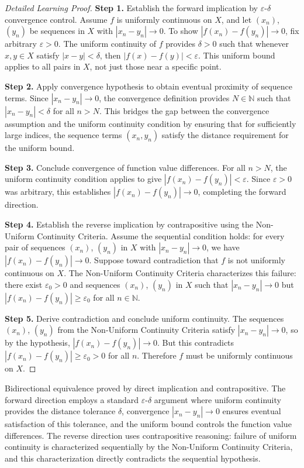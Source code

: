 \begin{proof}[Detailed Learning Proof]
\LRAProofBodyStart

\textbf{Step 1.} Establish the forward implication by $\varepsilon$-$\delta$ convergence control.
Assume $f$ is uniformly continuous on $X$, and let $(x_n)$, $(y_n)$ be sequences in $X$ with $|x_n - y_n| \to 0$. To show $|f(x_n) - f(y_n)| \to 0$, fix arbitrary $\varepsilon > 0$. The uniform continuity of $f$ provides $\delta > 0$ such that whenever $x, y \in X$ satisfy $|x - y| < \delta$, then $|f(x) - f(y)| < \varepsilon$. This uniform bound applies to all pairs in $X$, not just those near a specific point.

\textbf{Step 2.} Apply convergence hypothesis to obtain eventual proximity of sequence terms.
Since $|x_n - y_n| \to 0$, the convergence definition provides $N \in \mathbb{N}$ such that $|x_n - y_n| < \delta$ for all $n > N$. This bridges the gap between the convergence assumption and the uniform continuity condition by ensuring that for sufficiently large indices, the sequence terms $(x_n, y_n)$ satisfy the distance requirement for the uniform bound.

\textbf{Step 3.} Conclude convergence of function value differences.
For all $n > N$, the uniform continuity condition applies to give $|f(x_n) - f(y_n)| < \varepsilon$. Since $\varepsilon > 0$ was arbitrary, this establishes $|f(x_n) - f(y_n)| \to 0$, completing the forward direction.

\textbf{Step 4.} Establish the reverse implication by contrapositive using the Non-Uniform Continuity Criteria.
Assume the sequential condition holds: for every pair of sequences $(x_n)$, $(y_n)$ in $X$ with $|x_n - y_n| \to 0$, we have $|f(x_n) - f(y_n)| \to 0$. Suppose toward contradiction that $f$ is not uniformly continuous on $X$. The Non-Uniform Continuity Criteria characterizes this failure: there exist $\varepsilon_0 > 0$ and sequences $(x_n)$, $(y_n)$ in $X$ such that $|x_n - y_n| \to 0$ but $|f(x_n) - f(y_n)| \geq \varepsilon_0$ for all $n \in \mathbb{N}$.

\textbf{Step 5.} Derive contradiction and conclude uniform continuity.
The sequences $(x_n)$, $(y_n)$ from the Non-Uniform Continuity Criteria satisfy $|x_n - y_n| \to 0$, so by the hypothesis, $|f(x_n) - f(y_n)| \to 0$. But this contradicts $|f(x_n) - f(y_n)| \geq \varepsilon_0 > 0$ for all $n$. Therefore $f$ must be uniformly continuous on $X$.
\end{proof}

\begin{remark*}
Bidirectional equivalence proved by direct implication and contrapositive. The forward direction employs a standard $\varepsilon$-$\delta$ argument where uniform continuity provides the distance tolerance $\delta$, convergence $|x_n - y_n| \to 0$ ensures eventual satisfaction of this tolerance, and the uniform bound controls the function value differences. The reverse direction uses contrapositive reasoning: failure of uniform continuity is characterized sequentially by the Non-Uniform Continuity Criteria, and this characterization directly contradicts the sequential hypothesis.
\end{remark*}

